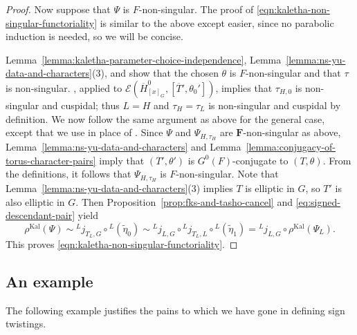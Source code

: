 \documentclass[reqno]{amsart}
\numberwithin{equation}{subsection}
\newcommand{\F}{\mathbf{F}}
\newcommand{\wt}[1]{\widetilde{#1}}
\newcommand{\ol}[1]{\overline{#1}}
\newcommand{\ld}{{}^L}
\newcommand\cE{\mathcal{E}}
\DeclareMathOperator{\Kal}{Kal}
\theoremstyle{remark}
\numberwithin{equation}{subsection}
\numberwithin{figure}{subsection}
\begin{document}
\begin{proof}
Now suppose that $\Psi$ is $F$-non-singular. The proof of \eqref{eqn:kaletha-non-singular-functoriality} is similar to the above except easier, since no parabolic induction is needed, so we will be concise. 

Lemma~\ref{lemma:kaletha-parameter-choice-independence}, Lemma~\ref{lemma:ns-yu-data-and-characters}(3), and \cite[Fact~3.1.4(1)]{Kal21b} show that the chosen $\theta$ is $F$-non-singular and that $\tau$ is non-singular. \cite[Lemma~2.9.4]{Cot26b}, applied to $\cE(\ol H^0_{[x]_G},[\ol T',\theta_0'])$, implies that $\tau_{H,0}$ is non-singular and cuspidal; thus $L = H$ and $\tau_H = \tau_L$ is non-singular and cuspidal by definition. We now follow the same argument as above for the general case, except that we use \cite[Lemma~2.9.2]{Cot26b} in place of \cite[Lemma~2.8.4]{Cot26b}. Since $\Psi$ and $\Psi_{H,\tau_H}$ are $\F$-non-singular as above, Lemma~\ref{lemma:ns-yu-data-and-characters} and Lemma~\ref{lemma:conjugacy-of-torus-character-pairs} imply that $(T',\theta')$ is $G^0(F)$-conjugate to $(T,\theta)$.
From the definitions, it follows that $\Psi_{H,\tau_H}$ is $F$-non-singular. Note that Lemma~\ref{lemma:ns-yu-data-and-characters}(3) implies $T$ is elliptic in $G$, so $T'$ is also elliptic in $G$. Then Proposition~\ref{prop:fks-and-tasho-cancel} and \eqref{eq:signed-descendant-pair} yield
\[
\rho^{\Kal}(\Psi)
\sim \ld j_{T_L,G}\circ\ld(\wt\eta_0)
\sim \ld j_{L,G}\circ\ld j_{T_L,L}\circ\ld(\wt\eta_1)
=\ld j_{L,G}\circ\rho^{\Kal}(\Psi_L).
\]
This proves \eqref{eqn:kaletha-non-singular-functoriality}.
\end{proof}

\subsection{An example}\label{ss:sign-example}

The following example justifies the pains to which we have gone in defining sign twistings.
\end{document}
